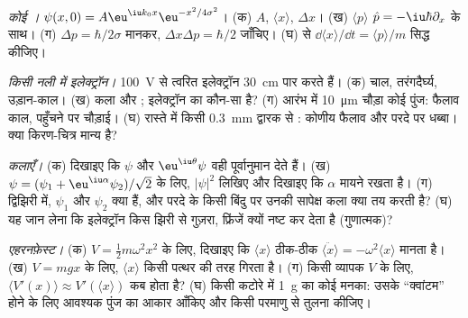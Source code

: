 \begin{exercise}[$\star\star$]\label{exo:b2:schrodinger-wave-functions:6}
\emph{कोई ।} $\psi(x,0) = A\eu^{\iu k_0x}\eu^{-x^2/4\sigma^2}$। (क)
$A$, $\langle x\rangle$, $\Delta x$। (ख) $\langle p\rangle$ $\hat p =
-\iu\hbar\partial_x$ के साथ। (ग) $\Delta p = \hbar/2\sigma$ मानकर,
$\Delta x\Delta p = \hbar/2$ जाँचिए। (घ)  से $\dd\langle x\rangle/\dd t = \langle
p\rangle/m$ सिद्ध कीजिए।
\end{exercise}

\begin{exercise}[$\star\star$]\label{exo:b2:schrodinger-wave-functions:7}
\emph{किसी नली में इलेक्ट्रॉन।} \qty{100}{V} से त्वरित इलेक्ट्रॉन
\qty{30}{cm} पार करते हैं। (क) चाल, तरंगदैर्घ्य, उड़ान-काल। (ख) कला और
; इलेक्ट्रॉन का कौन-सा है? (ग) आरंभ में
\qty{10}{\micro m} चौड़ा कोई पुंज: फैलाव काल, पहुँचने पर चौड़ाई। (घ) रास्ते में किसी
\qty{0.3}{mm} द्वारक से : कोणीय फैलाव और परदे पर धब्बा।
क्या किरण-चित्र मान्य है?
\end{exercise}

\begin{exercise}[$\star\star$]\label{exo:b2:schrodinger-wave-functions:8}
\emph{कलाएँ।} (क) दिखाइए कि $\psi$ और $\eu^{\iu\theta}\psi$ वही
पूर्वानुमान देते हैं। (ख) $\psi = (\psi_1 + \eu^{\iu\alpha}\psi_2)/\sqrt2$ के लिए,
$|\psi|^2$ लिखिए और दिखाइए कि $\alpha$ मायने रखता है। (ग) द्विझिरी में,
$\psi_1$ और $\psi_2$ क्या हैं, और परदे के किसी बिंदु पर उनकी सापेक्ष कला
क्या तय करती है? (घ) यह जान लेना कि इलेक्ट्रॉन किस झिरी से गुज़रा,
फ्रिंजें क्यों नष्ट कर देता है (गुणात्मक)?
\end{exercise}

\begin{exercise}[$\star\star$]\label{exo:b2:schrodinger-wave-functions:9}
\emph{एहरनफ़ेस्ट।} (क) $V = \tfrac12m\omega^2x^2$ के लिए, दिखाइए कि $\langle
x\rangle$ ठीक-ठीक $\ddot{\langle x\rangle} = -\omega^2\langle x\rangle$ मानता है।
(ख) $V = mgx$ के लिए, $\langle x\rangle$ किसी पत्थर की तरह गिरता है। (ग) किसी व्यापक
$V$ के लिए, $\langle V'(x)\rangle \approx V'(\langle x\rangle)$ कब होता है? (घ) किसी कटोरे में
\qty{1}{g} का कोई मनका: उसके ``क्वांटम'' होने के लिए आवश्यक पुंज का आकार आँकिए
और किसी परमाणु से तुलना कीजिए।
\end{exercise}


